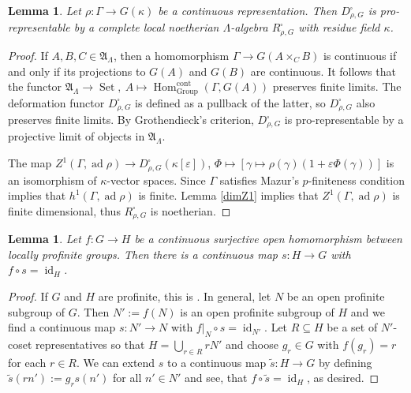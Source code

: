 \documentclass{amsart}
\newtheorem{lem}[prop]{Lemma}
\theoremstyle{definition}
\theoremstyle{remark}
\DeclareMathOperator{\Hom}{Hom}
\DeclareMathOperator{\id}{id}
\DeclareMathOperator{\Set}{Set}
\DeclareMathOperator{\ad}{ad}
\newcommand{\cont}{\mathrm{cont}}
\begin{document}
 \begin{lem}\label{Dnoetherian} Let $\rho : \Gamma \to G(\kappa)$ be a continuous representation. 
Then $D^{\square}_{\rho, G}$ is pro-representable by a complete local 
 noetherian
$\Lambda$-algebra $R^{\square}_{\rho, G}$ with residue field $\kappa$.
\end{lem}

\begin{proof} If $A,B,C \in \mathfrak A_{\Lambda}$, then a homomorphism $\Gamma \to G(A \times_C B)$ is continuous if and only if its projections to $G(A)$ and $G(B)$ are continuous. It follows that the functor $\mathfrak A_{\Lambda} \to \Set, ~ A \mapsto \Hom^{\cont}_{\mathrm{Group}}(\Gamma, G(A))$
preserves finite limits. The deformation functor $D^{\square}_{\rho, G}$ is defined as a pullback of the latter, so $D^{\square}_{\rho, G}$ also preserves finite limits. By Grothendieck's criterion, $D^{\square}_{\rho, G}$ is pro-representable by a projective limit of objects in $\mathfrak A_{\Lambda}$.

The map $Z^1(\Gamma, \ad \rho)\rightarrow D^{\square}_{\rho, G}(\kappa[\varepsilon])$, $\Phi\mapsto [\gamma \mapsto \rho(\gamma) (1 +\varepsilon \Phi(\gamma))]$ 
is an isomorphism of $\kappa$-vector spaces. Since $\Gamma$ satisfies Mazur's $p$-finiteness
condition
\cite[Theorem 3.4.1]{BJ_new} implies that $h^1(\Gamma, \ad \rho)$ is finite. 
Lemma \ref{dimZ1} implies that $Z^1(\Gamma, \ad \rho)$ is finite dimensional, thus 
$R^{\square}_{\rho, G}$ is noetherian.
\end{proof}



\begin{lem}\label{sectionexists} Let $f : G \to H$ be a continuous surjective open homomorphism between locally profinite groups. Then there is a continuous map 
$s: H \to G$ with $f \circ s = \id_H$.
\end{lem}

\begin{proof} If $G$ and $H$ are profinite, this is \cite[Section I.1, Proposition 1]{SerreGalCoh}.
In general, let $N$ be an open profinite subgroup of $G$. Then $N' := f(N)$ is an open profinite subgroup of $H$ and we find a continuous map $s : N' \to N$ with $f|_N \circ s = \id_{N'}$. Let $R \subseteq H$ be a set of $N'$-coset representatives so that $H = \bigcup_{r \in R} rN'$ and choose $g_r \in G$ with $f(g_r) = r$ for each $r \in R$.
We can extend $s$ to a continuous map $\tilde s : H \to G$ by defining $\tilde s(rn') := g_rs(n')$ for all $n' \in N'$ and see, that $f \circ \tilde s = \id_H$, as desired.
\end{proof}
\end{document}
